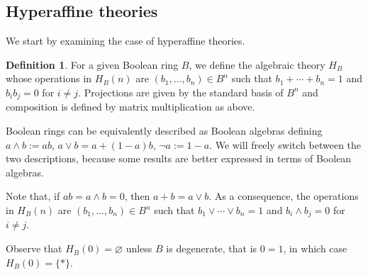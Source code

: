 \documentclass{amsart}
\numberwithin{equation}{section}
\theoremstyle{plain}
\theoremstyle{definition}
\newtheorem{definition}[theorem]{Definition}
\begin{document}
\subsection{Hyperaffine theories} 
We start by examining the case of hyperaffine theories. 


\begin{definition}
  For a given Boolean ring $B$, we define the algebraic theory $H_B$ whose operations in $H_B(n)$ are $(b_1, \ldots, b_n) \in B^n$ such that $b_1 + \cdots +b_n =1$ and $b_i b_j =0$ for $i \neq j$. 
  Projections are given by the standard basis of $B^n$ and composition is defined by matrix multiplication as above. 
\end{definition}

Boolean rings can be equivalently described as Boolean algebras defining $a \land b := ab$, $a\lor b= a + (1-a)b$, $\lnot a:=1-a$. 
We will freely switch between the two descriptions, because some results are better expressed in terms of Boolean algebras.


Note that, 
if $a b = a \land b = 0$, then $a +b = a \lor b$. 
As a consequence, the operations in $H_B(n)$ are $(b_1, \ldots, b_n) \in B^n$ such that $b_1 \lor \cdots \lor b_n =1$ and $b_i  \land b_j =0$ for $i \neq j$. 

Observe that $H_B(0)=\varnothing$ unless $B$ is degenerate, that is $0 = 1$, in which case $H_B(0)=\{*\}$. 
\end{document}
